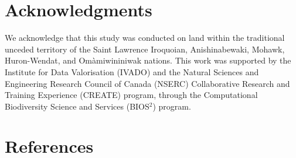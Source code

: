 \documentclass[11pt]{article}
\begin{document}
\hypertarget{acknowledgments}{%
\section{Acknowledgments}\label{acknowledgments}}

We acknowledge that this study was conducted on land within the
traditional unceded territory of the Saint Lawrence Iroquoian,
Anishinabewaki, Mohawk, Huron-Wendat, and Omàmiwininiwak nations. This
work was supported by the Institute for Data Valorisation (IVADO) and
the Natural Sciences and Engineering Research Council of Canada (NSERC)
Collaborative Research and Training Experience (CREATE) program, through
the Computational Biodiversity Science and Services (BIOS\(^2\))
program.

\hypertarget{references}{%
\section*{References}\label{references}}
\end{document}
